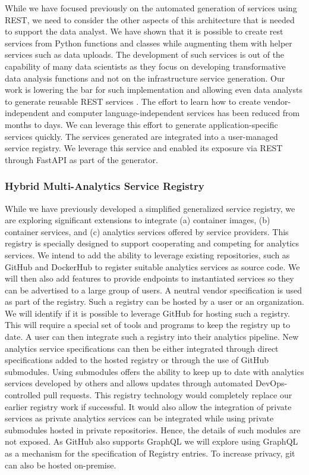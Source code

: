 While we have focused previously on the automated generation of
services using REST, we need to consider the other aspects of this
architecture that is needed to support the data analyst. We have
shown that it is possible to create rest services from Python
functions and classes while augmenting them with helper services such
as data uploads. The development of such services is out of the
capability of many data scientists as they focus on developing
transformative data analysis functions and not on the infrastructure
service generation. Our work is lowering the bar for such
implementation and allowing even data analysts to generate reusable
REST services \cite{las21openapi}. The effort to learn how to
create vendor-independent and computer language-independent services
has been reduced from months to days. We can leverage this effort to
generate application-specific services quickly. The services generated
are integrated into a user-managed service registry. We leverage
this service and enabled its exposure via REST through FastAPI as part
of the generator.

\subsubsection{Hybrid Multi-Analytics Service Registry}


While we have previously developed a simplified generalized service
registry, we are exploring significant extensions to integrate (a)
container images, (b) container services, and (c) analytics 
services offered by service providers. This registry is specially
designed to support cooperating and competing for analytics services.
We intend to add the ability to leverage existing repositories, such as
GitHub and DockerHub to register suitable analytics services as source
code. We will then also add features to provide endpoints to
instantiated services so they can be advertised to a large group of
users. A neutral vendor specification is used as part of the
registry. Such a registry can be hosted by a user or an
organization. We will identify if it is possible to leverage GitHub
for hosting such a registry. This will require a special set of tools
and programs to keep the registry up to date. A user can then
integrate such a registry into their analytics pipeline. New analytics
service specifications can then be either integrated through direct
specifications added to the hosted registry or through the use of
GitHub submodules. Using submodules offers the ability to keep up to
date with analytics services developed by others and allows updates
through automated DevOps-controlled pull requests. This registry
technology would completely replace our earlier registry work if
successful. It would also allow the integration of private services as
private analytics services can be integrated while using private
submodules hosted in private repositories. Hence, the details of such
modules are not exposed. As GitHub also supports GraphQL we will
explore using GraphQL as a mechanism for the specification of Registry
entries. To increase privacy, git can also be hosted on-premise.

